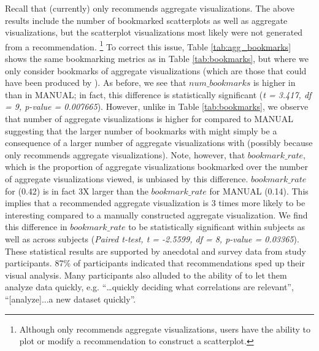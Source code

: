 Recall that \SeeDB (currently) only  recommends aggregate visualizations.
The above results include the number of bookmarked scatterplots as well as aggregate visualizations, but 
the scatterplot visualizations most likely were not generated from a \SeeDB recommendation.
\footnote{Although \SeeDB only recommends aggregate
visualizations, users have the ability to plot or modify a recommendation to construct a scatterplot.}
To correct this issue, Table \ref{tab:agg_bookmarks} shows the same bookmarking metrics as in Table \ref{tab:bookmarks},
but where we only consider bookmarks of aggregate visualizations (which are those that could have been produced by \SeeDB). 
As before, we see that $num\_bookmarks$ is higher in \SeeDB than in MANUAL; in fact, this difference
is statistically significant ({\em t = 3.417, df = 9, p-value = 0.007665}).
However, unlike in Table \ref{tab:bookmarks}, we observe that number of aggregate visualizations 
is higher for \SeeDB compared to MANUAL suggesting that the larger number of bookmarks with \SeeDB 
might simply be a consequence of a larger number of aggregate visualizations with \SeeDB (possibly because
\SeeDB only recommends aggregate visualizations).
Note, however, that $bookmark\_rate$, which is the proportion of aggregate visualizations bookmarked
over the number of aggregate visualizations viewed, is unbiased by this difference.
 $bookmark\_rate$ for \SeeDB (0.42) is in fact 3X larger than the $bookmark\_rate$ for 
MANUAL (0.14).
This implies that a \SeeDB recommended aggregate visualization is 3 times more likely to be
interesting compared to a manually constructed aggregate visualization.
We find this difference in $bookmark\_rate$ to be statistically significant within subjects as well 
as across subjects ({\em Paired t-test, t = -2.5599, df = 8, p-value = 0.03365}).
These statistical results are supported by anecdotal and survey data from study participants.
87\% of participants indicated that \SeeDB recommendations sped up their visual analysis. 
Many participants also alluded to the ability of \SeeDB to let them analyze data quickly, e.g. 
``\ldots quickly deciding what correlations are relevant'', ``[analyze]...a new dataset quickly''.

